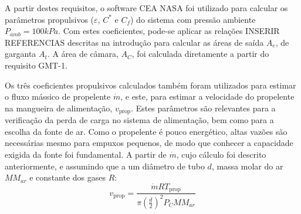 A partir destes requisitos, o software CEA NASA foi utilizado para calcular os parâmetros propulsivos (\(\varepsilon \), \(C^\ast \) e \(C_f\)) do sistema com pressão ambiente \(P_{amb} = 100kPa\). Com estes coeficientes, pode-se aplicar as relações INSERIR REFERENCIAS descritas na introdução para calcular as áreas de saída \(A_e\), de garganta \(A_t\). A área de câmara, \(A_C\), foi calculada diretamente a partir do requisito GMT-1.

Os três coeficientes propulsivos calculados também foram utilizados para estimar o fluxo mássico de propelente \(\dot{m}\), e este, para estimar a velocidade do propelente na mangueira de alimentação, \(v_{\text{prop}}\). Estes parâmetros são relevantes para a verificação da perda de carga no sistema de alimentação, bem como para a escolha da fonte de ar. Como o propelente é pouco energético, altas vazões são necessárias mesmo para empuxos pequenos, de modo que conhecer a capacidade exigida da fonte foi fundamental. A partir de \(\dot{m}\), cujo cálculo foi descrito anteriormente, e assumindo que a  um diâmetro de tubo \(d\), massa molar do ar \(MM_{ar}\) e constante dos gases \(R\):
\begin{equation}
    v_{\text{prop}} = \frac{\dot{m} R T_{\text{prop}}}{\pi \left(\frac{d}{2}\right)^2 P_C MM_{ar}}
\end{equation}

